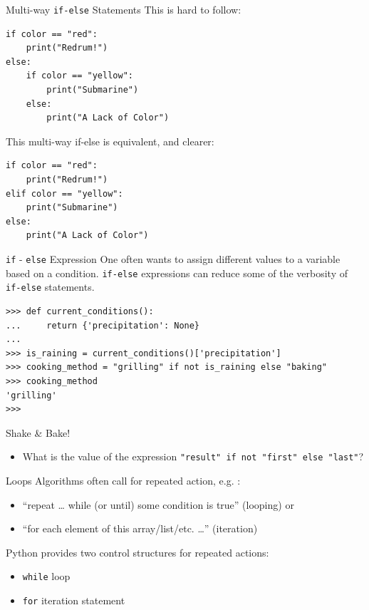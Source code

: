 \documentclass[smaller, aspectratio=1610]{beamer}
\begin{document}
\begin{frame}[label={sec:orgd653f98},fragile]{Multi-way \texttt{if-else} Statements}
 This is hard to follow:

\lstset{language=Python,label= ,caption= ,captionpos=b,numbers=none}
\begin{lstlisting}
if color == "red":
    print("Redrum!")
else:
    if color == "yellow":
        print("Submarine")
    else:
        print("A Lack of Color")
\end{lstlisting}

This multi-way if-else is equivalent, and clearer:

\lstset{language=Python,label= ,caption= ,captionpos=b,numbers=none}
\begin{lstlisting}
if color == "red":
    print("Redrum!")
elif color == "yellow":
    print("Submarine")
else:
    print("A Lack of Color")
\end{lstlisting}
\end{frame}

\begin{frame}[label={sec:org1c79f3f},fragile]{\texttt{if} - \texttt{else} Expression}
 One often wants to assign different values to a variable based on a condition.  \texttt{if-else} expressions can reduce some of the verbosity of \texttt{if-else} statements.

\lstset{language=Python,label= ,caption= ,captionpos=b,numbers=none}
\begin{lstlisting}
>>> def current_conditions():
...     return {'precipitation': None}
...
>>> is_raining = current_conditions()['precipitation']
>>> cooking_method = "grilling" if not is_raining else "baking"
>>> cooking_method
'grilling'
>>>
\end{lstlisting}

\begin{block}{Shake \& Bake!}
\begin{itemize}
\item What is the value of the expression \texttt{"result" if not "first" else "last"}?
\end{itemize}
\end{block}
\end{frame}

\begin{frame}[label={sec:org5ed2cfc},fragile]{Loops}
 Algorithms often call for repeated action, e.g. :

\begin{itemize}
\item “repeat \ldots{} while (or until) some condition is true” (looping) or
\item “for each element of this array/list/etc. \ldots{}” (iteration)
\end{itemize}

Python provides two control structures for repeated actions:

\begin{itemize}
\item \texttt{while} loop
\item \texttt{for} iteration statement
\end{itemize}
\end{frame}
\end{document}

